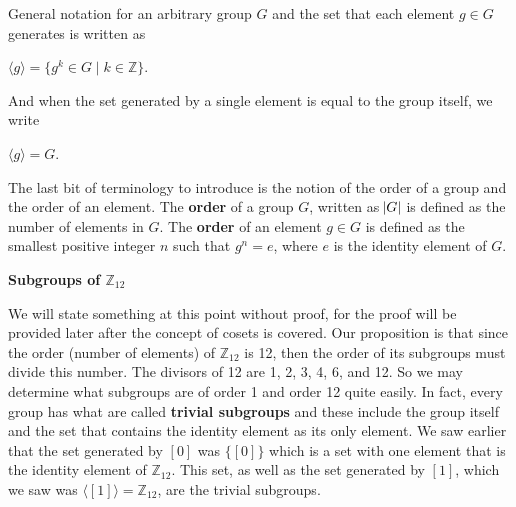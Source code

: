 \documentclass[12pt, a4paper]{article}
\begin{document}
    General notation for an arbitrary group $G$ and the set that each element $g\in G$ generates is written as\par
    
\vspace{4mm}

        \centerline{$\langle g\rangle=\{g^k\in G\mid k\in\mathbb{Z}\}$.}
        
\vspace{4mm}

    And when the set generated by a single element is equal to the group itself, we write\par
    
\vspace{4mm}

        \centerline{$\langle g\rangle=G$.}
        
\vspace{4mm}

    The last bit of terminology to introduce is the notion of the order of a group and the order of an element. The \textbf{order} of a group $G$, written as $\abs{G}$ is defined as the number of elements in $G$. The \textbf{order} of an element $g\in G$ is defined as the smallest positive integer $n$ such that $g^n=e$, where $e$ is the identity element of $G$.

\begin{flushleft}

    \textbf{\large{Subgroups of $\mathbb{Z}_{12}$}}\normalsize

\end{flushleft}

    We will state something at this point without proof, for the proof will be provided later after the concept of cosets is covered. Our proposition is that since the order (number of elements) of $\mathbb{Z}_{12}$ is 12, then the order of its subgroups must divide this number. The divisors of 12 are 1, 2, 3, 4, 6, and 12. So we may determine what subgroups are of order 1 and order 12 quite easily. In fact, every group has what are called \textbf{trivial subgroups} and these include the group itself and the set that contains the identity element as its only element. We saw earlier that the set generated by $[0]$ was $\{[0]\}$ which is a set with one element that is the identity element of $\mathbb{Z}_{12}$. This set, as well as the set generated by $[1]$, which we saw was $\langle [1]\rangle=\mathbb{Z}_{12}$, are the trivial subgroups.\par
    
\end{document}
